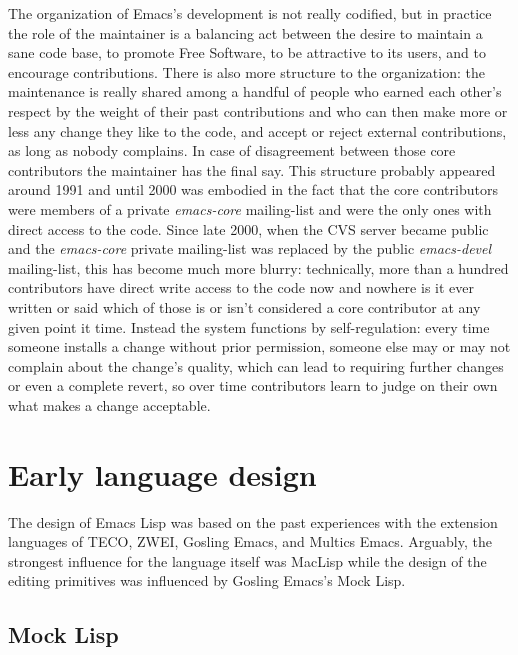 \documentclass[format=acmsmall, review]{acmart}
\newcommand \Elisp {Emacs Lisp}
\begin{document}
The organization of Emacs's development is not really codified, but in
practice the role of the maintainer is a balancing act between the desire to
maintain a sane code base, to promote Free Software, to be attractive to its
users, and to encourage contributions.  There is also more structure to the
organization: the maintenance is really shared among a handful of people who
earned each other's respect by the weight of their past contributions and
who can then make more or less any change they like to the code, and accept
or reject external contributions, as long as nobody complains.  In case of
disagreement between those core contributors the maintainer has the final
say.  This structure probably appeared around 1991 and until 2000 was
embodied in the fact that the core contributors were members of a private
\emph{emacs-core} mailing-list and were the only ones with direct access to
the code.  Since late 2000, when the CVS server became public and the
\emph{emacs-core} private mailing-list was replaced by the public
\emph{emacs-devel} mailing-list, this has become much more blurry:
technically, more than a hundred contributors have direct write access to
the code now and nowhere is it ever written or said which of those is or
isn't considered a core contributor at any given point it time.  Instead the
system functions by self-regulation: every time someone installs a change
without prior permission, someone else may or may not complain about the
change's quality, which can lead to requiring further changes or even
a complete revert, so over time contributors learn to judge on their own
what makes a change acceptable.




\section{Early language design}         %
\label{sec:early-history}

The design of \Elisp{} was based on the past experiences with the extension
languages of TECO, ZWEI, Gosling Emacs, and Multics Emacs.
Arguably, the strongest influence for the language itself was MacLisp while
the design of the editing primitives was influenced by Gosling Emacs's
Mock Lisp.

\subsection{Mock Lisp}
\end{document}
